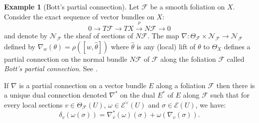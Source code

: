 \documentclass[12pt]{amsart}
\theoremstyle{definition}
\newtheorem{example}[definition]{Example}
\theoremstyle{plain}
\theoremstyle{exampstyle}
\theoremstyle{exampstyle}\newtheorem{thmxbis}{Theorem}
\numberwithin{equation}{section}
\theoremstyle{remark}
\begin{document}
\begin{example}[Bott's partial connection] \label{example-Bott}
Let $\mathcal F$ be a smooth foliation on $X$. Consider the exact sequence of vector bundles on $X$: 
$$ 0 \rightarrow T\mathcal F \rightarrow TX \overset{\rho}{\rightarrow} N\mathcal F \rightarrow 0$$
and denote by $\mathcal N_\mathcal F$ the sheaf of sections of $N\mathcal F$. The map $\nabla : \Theta_\mathcal F \times \mathcal N_\mathcal F \rightarrow \mathcal N_\mathcal F$ defined by
 $\nabla_w(\theta) =  \rho([w,\hat{\theta}])$
where $\hat{\theta}$ is any (local) lift of $\theta$ to $\Theta_X$ defines a partial connection on the normal bundle $N\mathcal F$ of $\mathcal F$ along the foliation $\mathcal F$ called \textit{Bott's partial connection}. See \cite[Section 4]{Pereira-JEMS}.
%
%
\end{example}

{\remark If $\nabla$ is a partial connection on a vector bundle $E$ along a foliation $\mathcal F$ then there is a unique dual connection denoted $\nabla^\ast$ on the dual $E^\ast$ of $E$ along $\mathcal F$ such that for every local sections $v \in \Theta_\mathcal F(U)$, $\omega \in \mathcal E^\vee(U)$ and $\sigma \in \mathcal E(U)$, we have:
$$ \delta_v(\omega(\sigma)) = \nabla^\ast_v(\omega)(\sigma) + \omega (\nabla_v(\sigma)).$$}
\end{document}

